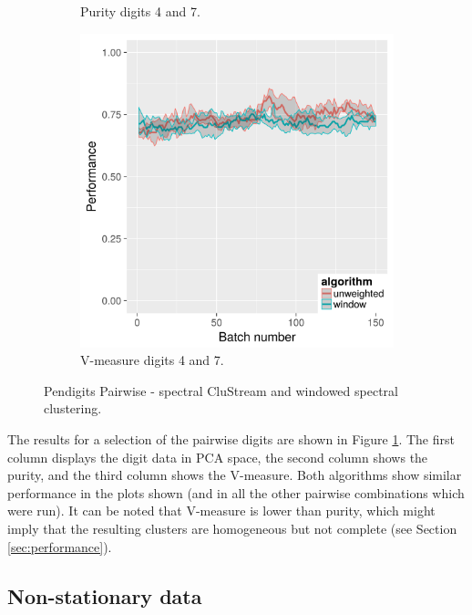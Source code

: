 \begin{figure}[H]
\begin{subfigure}{.3\textwidth}
  \caption{Purity digits 4 and 7.}
\end{subfigure}
\begin{subfigure}{.3\textwidth}
  \centering
  \includegraphics[width=\linewidth]{pendigits_2_alg/uci_pendigits_47_ci_one_size_vmeasure.png}
  \caption{V-measure digits 4 and 7.}
\end{subfigure}
\caption{Pendigits Pairwise - spectral CluStream and windowed spectral clustering.}
\label{fig:uci_pendigits}
\end{figure}

The results for a selection of the pairwise digits are shown in Figure \ref{fig:uci_pendigits}. The first column displays the digit data in PCA space, the second column shows the purity, and the third column shows the V-measure. Both algorithms show similar performance in the plots shown (and in all the other pairwise combinations which were run).  It can be noted that V-measure is lower than purity, which might imply that the resulting clusters are homogeneous but not complete (see Section \ref{sec:performance}). 



\subsection{Non-stationary data}
\label{sec:non_stationary}

